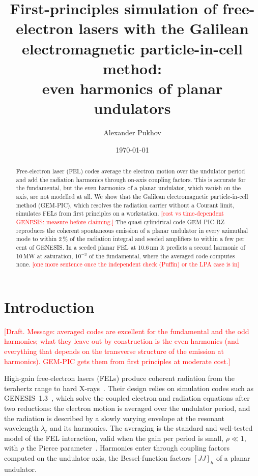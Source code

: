 \documentclass[aps,prab,reprint,floatfix,superscriptaddress,amsmath,amssymb]{revtex4-2}
\newcommand{\todo}[1]{\textcolor{red}{[#1]}}
\begin{document}
\title{First-principles simulation of free-electron lasers with the Galilean electromagnetic particle-in-cell method:\\ even harmonics of planar undulators}

\author{Alexander Pukhov}

\date{\today}

\begin{abstract}
Free-electron laser (FEL) codes average the electron motion over the undulator period and add the radiation harmonics through on-axis coupling factors. This is accurate for the fundamental, but the even harmonics of a planar undulator, which vanish on the axis, are not modelled at all. We show that the Galilean electromagnetic particle-in-cell method (GEM-PIC), which resolves the radiation carrier without a Courant limit, simulates FELs from first principles on a workstation. \todo{cost vs time-dependent GENESIS: measure before claiming.} The quasi-cylindrical code GEM-PIC-RZ reproduces the coherent spontaneous emission of a planar undulator in every azimuthal mode to within 2\,\% of the radiation integral and seeded amplifiers to within a few per cent of GENESIS. In a seeded planar FEL at 10.6\,nm it predicts a second harmonic of 10\,MW at saturation, $10^{-3}$ of the fundamental, where the averaged code computes none. \todo{one more sentence once the independent check (Puffin) or the LPA case is in}
\end{abstract}

\maketitle

\section{Introduction}\label{sec:intro}

\todo{Draft. Message: averaged codes are excellent for the fundamental and the odd harmonics; what they leave out by construction is the even harmonics (and everything that depends on the transverse structure of the emission at harmonics). GEM-PIC gets them from first principles at moderate cost.}

High-gain free-electron lasers (FELs) produce coherent radiation from the terahertz range to hard X-rays~\cite{Pellegrini2016,KimHuangLindberg}. Their design relies on simulation codes such as GENESIS~1.3~\cite{Reiche1999,Genesis4}, which solve the coupled electron and radiation equations after two reductions: the electron motion is averaged over the undulator period, and the radiation is described by a slowly varying envelope at the resonant wavelength $\lambda_r$ and its harmonics. The averaging is the standard and well-tested model of the FEL interaction, valid when the gain per period is small, $\rho \ll 1$, with $\rho$ the Pierce parameter~\cite{Bonifacio1984}. Harmonics enter through coupling factors computed on the undulator axis, the Bessel-function factors $[JJ]_h$ of a planar undulator.
\end{document}
